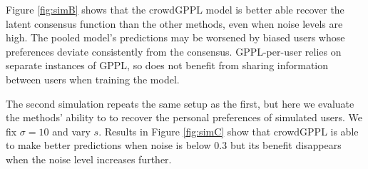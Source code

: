 Figure \ref{fig:simB} shows that the crowdGPPL model is better able recover the latent consensus
function than the other methods, even when noise levels are high. 
The pooled model's predictions may be worsened by biased users whose preferences deviate
 consistently from the consensus. GPPL-per-user relies on separate instances of GPPL, so 
 does not benefit from sharing information between users when training the model.

The second simulation repeats the same setup as the first, 
but here we evaluate the methods'
ability to to recover the personal preferences of simulated users.
We fix $\sigma = 10$ and vary $s$.
Results in Figure \ref{fig:simC} show that crowdGPPL is able to make better 
predictions when noise is below $0.3$ but its benefit disappears when 
the noise level increases further. 

